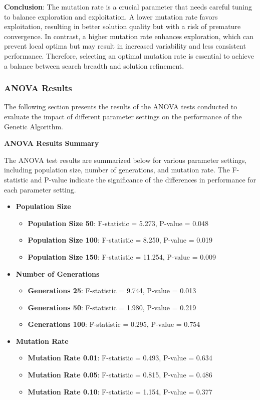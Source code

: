 \documentclass{article}
\begin{document}
    \textbf{Conclusion}: The mutation rate is a crucial parameter that needs careful tuning to balance exploration and exploitation. A lower mutation rate favors exploitation, resulting in better solution quality but with a risk of premature convergence. In contrast, a higher mutation rate enhances exploration, which can prevent local optima but may result in increased variability and less consistent performance. Therefore, selecting an optimal mutation rate is essential to achieve a balance between search breadth and solution refinement.

    \subsubsection{ANOVA Results}

    The following section presents the results of the ANOVA tests conducted to evaluate the impact of different parameter settings on the performance of the Genetic Algorithm.

    \textbf{ANOVA Results Summary}

    The ANOVA test results are summarized below for various parameter settings, including population size, number of generations, and mutation rate. The F-statistic and P-value indicate the significance of the differences in performance for each parameter setting.

    \begin{itemize}
        \item \textbf{Population Size}
        \begin{itemize}
            \item \textbf{Population Size 50}: F-statistic = 5.273, P-value = 0.048
            \item \textbf{Population Size 100}: F-statistic = 8.250, P-value = 0.019
            \item \textbf{Population Size 150}: F-statistic = 11.254, P-value = 0.009
        \end{itemize}
        \item \textbf{Number of Generations}
        \begin{itemize}
            \item \textbf{Generations 25}: F-statistic = 9.744, P-value = 0.013
            \item \textbf{Generations 50}: F-statistic = 1.980, P-value = 0.219
            \item \textbf{Generations 100}: F-statistic = 0.295, P-value = 0.754
        \end{itemize}
        \item \textbf{Mutation Rate}
        \begin{itemize}
            \item \textbf{Mutation Rate 0.01}: F-statistic = 0.493, P-value = 0.634
            \item \textbf{Mutation Rate 0.05}: F-statistic = 0.815, P-value = 0.486
            \item \textbf{Mutation Rate 0.10}: F-statistic = 1.154, P-value = 0.377
        \end{itemize}
    \end{itemize}
\end{document}
